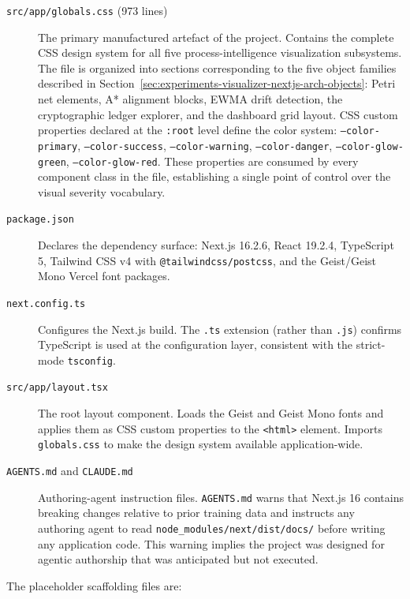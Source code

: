 \begin{description}
  \item[\texttt{src/app/globals.css} (973 lines)]
    The primary manufactured artefact of the project. Contains the complete CSS design system
    for all five process-intelligence visualization subsystems. The file is organized into
    sections corresponding to the five object families described in
    Section~\ref{sec:experiments-visualizer-nextjs-arch-objects}: Petri net elements, A{*}
    alignment blocks, EWMA drift detection, the cryptographic ledger explorer, and the
    dashboard grid layout. CSS custom properties declared at the \texttt{:root} level define
    the color system: \texttt{--color-primary}, \texttt{--color-success},
    \texttt{--color-warning}, \texttt{--color-danger}, \texttt{--color-glow-green},
    \texttt{--color-glow-red}. These properties are consumed by every component class in
    the file, establishing a single point of control over the visual severity vocabulary.

  \item[\texttt{package.json}]
    Declares the dependency surface: Next.js 16.2.6, React 19.2.4, TypeScript 5,
    Tailwind CSS v4 with \texttt{@tailwindcss/postcss}, and the Geist/Geist Mono Vercel
    font packages.

  \item[\texttt{next.config.ts}]
    Configures the Next.js build. The \texttt{.ts} extension (rather than \texttt{.js})
    confirms TypeScript is used at the configuration layer, consistent with the strict-mode
    \texttt{tsconfig}.

  \item[\texttt{src/app/layout.tsx}]
    The root layout component. Loads the Geist and Geist Mono fonts and applies them as
    CSS custom properties to the \texttt{<html>} element. Imports \texttt{globals.css}
    to make the design system available application-wide.

  \item[\texttt{AGENTS.md} and \texttt{CLAUDE.md}]
    Authoring-agent instruction files. \texttt{AGENTS.md} warns that Next.js 16 contains
    breaking changes relative to prior training data and instructs any authoring agent to
    read \texttt{node\_modules/next/dist/docs/} before writing any application code.
    This warning implies the project was designed for agentic authorship that was
    anticipated but not executed.
\end{description}

The placeholder scaffolding files are:

